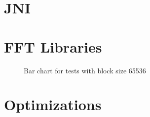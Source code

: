 \textit{}

\section{JNI}

\section{FFT Libraries}

\begin{figure}
    \centering
    \resizebox{\columnwidth}{!}{
        
    }
    \label{tab:barchart:65536}
    \caption{Bar chart for tests with block size 65536}
\end{figure}



\section{Optimizations}

